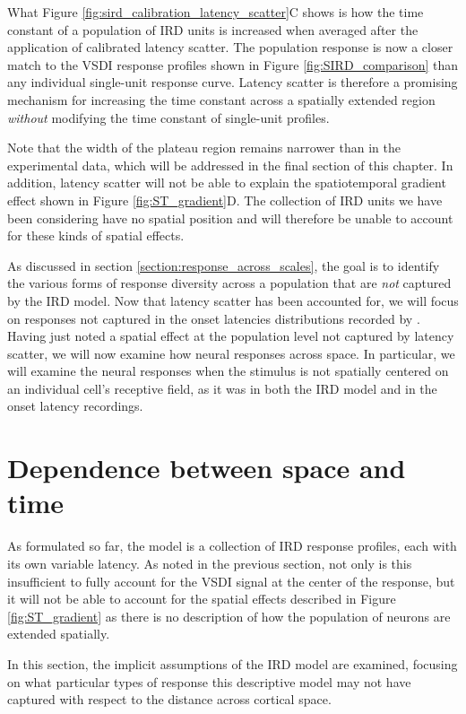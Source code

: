 \documentclass[phd,ianc,twoside]{infthesis}
\begin{document}
What Figure \ref{fig:sird_calibration_latency_scatter}C shows is how the
time constant of a population of IRD units is increased when averaged
after the application of calibrated latency scatter. The population
response is now a closer match to the VSDI response profiles shown in
Figure \ref{fig:SIRD_comparison} than any individual single-unit
response curve. Latency scatter is therefore a promising mechanism for
increasing the time constant across a spatially extended region
\emph{without} modifying the time constant of single-unit profiles.

Note that the width of the plateau region remains narrower than in the
experimental data, which will be addressed in the final section of this
chapter. In addition, latency scatter will not be able to explain the
spatiotemporal gradient effect shown in Figure
\ref{fig:ST_gradient}D. The collection of IRD units we have been
considering have no spatial position and will therefore be unable to
account for these kinds of spatial effects.

As discussed in section \ref{section:response_across_scales}, the goal
is to identify the various forms of response diversity across a
population that are \emph{not} captured by the IRD model. Now that
latency scatter has been accounted for, we will focus on responses not
captured in the onset latencies distributions recorded by
\citet{nowak_visneuro95}. Having just noted a spatial effect at the
population level not captured by latency scatter, we will now examine
how neural responses across space. In particular, we will examine the
neural responses when the stimulus is not spatially centered on an
individual cell's receptive field, as it was in both the IRD model and
in the onset latency recordings.


\section{Dependence between space and time}

As formulated so far, the model is a collection of IRD response
profiles, each with its own variable latency. As noted in the previous
section, not only is this insufficient to fully account for the VSDI
signal at the center of the response, but it will not be able to account
for the spatial effects described in Figure \ref{fig:ST_gradient} as
there is no description of how the population of neurons are extended
spatially.

In this section, the implicit assumptions of the IRD model are examined,
focusing on what particular types of response this descriptive model may
not have captured with respect to the distance across cortical space.
\end{document}
